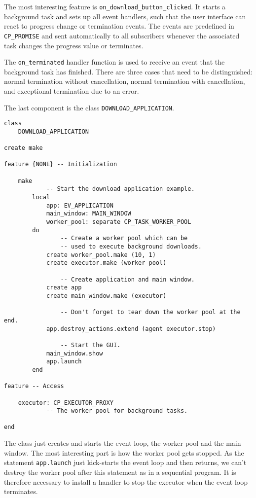 The most interesting feature is \lstinline!on_download_button_clicked!.
It starts a background task and sets up all event handlers, such that the user interface can react to progress change or termination events.
The events are predefined in \lstinline!CP_PROMISE! and sent automatically to all subscribers whenever the associated task changes the progress value or terminates.

The \lstinline!on_terminated! handler function is used to receive an event that the background task has finished.
There are three cases that need to be distinguished: normal termination without cancellation, normal termination with cancellation, and exceptional termination due to an error.

The last component is the class \lstinline!DOWNLOAD_APPLICATION!.

\begin{lstlisting}[language=OOSC2Eiffel, label={code:download-application}, captionpos=b, caption={Download application root class.}]
class
	DOWNLOAD_APPLICATION

create make

feature {NONE} -- Initialization

	make
			-- Start the download application example.
		local
			app: EV_APPLICATION
			main_window: MAIN_WINDOW
			worker_pool: separate CP_TASK_WORKER_POOL
		do
				-- Create a worker pool which can be 
				-- used to execute background downloads.
			create worker_pool.make (10, 1)
			create executor.make (worker_pool)

				-- Create application and main window.
			create app
			create main_window.make (executor)

				-- Don't forget to tear down the worker pool at the end.
			app.destroy_actions.extend (agent executor.stop)

				-- Start the GUI.
			main_window.show
			app.launch
		end

feature -- Access

	executor: CP_EXECUTOR_PROXY
			-- The worker pool for background tasks.

end
\end{lstlisting}

The class just creates and starts the event loop, the worker pool and the main window.
The most interesting part is how the worker pool gets stopped.
As the statement \lstinline!app.launch! just kick-starts the event loop and then returns, we can't destroy the worker pool after this statement as in a sequential program.
It is therefore necessary to install a handler to stop the executor when the event loop terminates.

